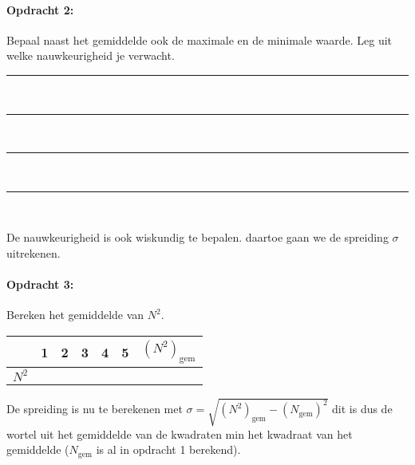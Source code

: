 \bigskip{}

\begin{minipage}[t]{1\columnwidth}%

\paragraph{Opdracht 2:}

Bepaal naast het gemiddelde ook de maximale en de minimale
waarde. Leg uit welke nauwkeurigheid je verwacht.

\begin{center}
    \rule{\textwidth}{0.3mm}\\
    \rule{\textwidth}{0.3mm}\\
    \rule{\textwidth}{0.3mm}\\
    \rule{\textwidth}{0.3mm}\\
\end{center}
\end{minipage}

\bigskip{}


De nauwkeurigheid is ook wiskundig te bepalen. daartoe gaan we de spreiding $\sigma$ uitrekenen.

\begin{minipage}[t]{1\columnwidth}%

\paragraph{Opdracht 3:}

Bereken het gemiddelde van $N^{2}$.

\bigskip{}


\begin{tabular}{|x{.11\textwidth}|x{.11\textwidth}|x{.11\textwidth}
                |x{.11\textwidth}|x{.11\textwidth}|x{.11\textwidth}
                |x{.11\textwidth}|}
     & 1 & 2 & 3 & 4 & 5 & $\left(N^{2}\right)_\textrm{gem}$\\
    \hline 
    $N^{2}$ &  &  &  &  &  & \\
    \hline 
\end{tabular}

\bigskip{}

De spreiding is nu te berekenen met
$\sigma=\sqrt{\left(N^{2}\right)_\textrm{gem}-\left(N_\textrm{gem}\right)^{2}}$ dit is
dus de wortel uit het gemiddelde van de kwadraten min het kwadraat van
het gemiddelde ($N_\textrm{gem}$ is al in opdracht 1 berekend).

\end{minipage}

